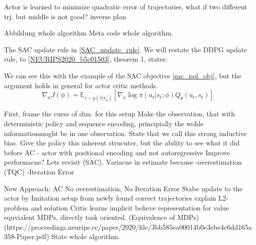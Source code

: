 Actor is learned to minimize quadratic error of trajectories, what if two different trj. but middle is not good? inverse plan

Abbildung whole algorithm
Meta code whole algorithm.


The SAC update rule in \ref{SAC_update_rule}. We will restate the DDPG update rule, to 
\ref{NEURIPS2020_b5c01503}, theorem 1, states:

We can see this with the example of the SAC objective \ref{sac_pol_obj}, but the argument holds in general for actor critic methods.  
\begin{equation}
    \label{AC_general_update}
    \nabla_{\phi} J(\phi) = \mathbb{E}_{\tau \sim p(\tau | \pi_{\phi})} \left[\nabla_{\phi} \log \pi(a_t|s_t;\phi) Q_{\theta}(a_t, s_t) \right]
\end{equation}




First, frame the curse of dim. for this setup
Make the observation, that with deterministic policy and sequence encoding, principially the wohle informationmoght be in one observation.
State that we call this strong inductive bias. 
Give the policy this inherent strucuter, but the ability to see what it did before
AC - actor with positional encoding and not autoregressive
Improve performacne? Lets revisit (SAC).
Variacne in estimate because 
-overestimation (TQC)
-Iteration Error

New Approach: AC
No overestimation, No Iteration Error
Stabe update to the actor by Imitation setup from newly found correct trajectories
explain L2-problem and solution
Critic learns implicit believe representation for value equvialent MDPs, directly task oriented. (Equivalence of MDPs) (https://proceedings.neurips.cc/paper/2020/file/3bb585ea00014b0e3ebe4c6dd165a358-Paper.pdf)
State whole algorithm.

